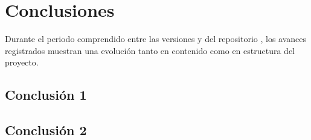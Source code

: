
\section{Conclusiones}
\label{sec:conclusiones}


Durante el periodo comprendido entre las versiones \texttt{\VerRef}
y \texttt{\VerActual} del repositorio \texttt{\NombreRepo}, los avances
registrados muestran una evolución tanto en contenido como en estructura
del proyecto.

\subsection{Conclusión 1}
\label{ssec:conclusion-1}


\subsection{Conclusión 2}
\label{ssec:conclusion-2}

